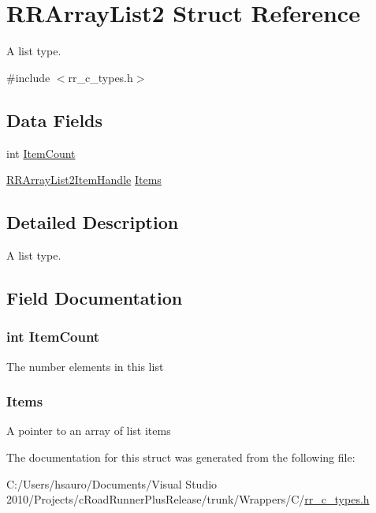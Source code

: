 \hypertarget{struct_r_r_array_list2}{
\section{\-R\-R\-Array\-List2 \-Struct \-Reference}
\label{struct_r_r_array_list2}
}


\-A list type.  




{\ttfamily \#include $<$rr\-\_\-c\-\_\-types.\-h$>$}

\subsection*{\-Data \-Fields}
\begin{DoxyCompactItemize}
\item 
int \hyperlink{struct_r_r_array_list2_ab970c710c7f3897df3c63f76dc5a0793}{\-Item\-Count}
\item 
\hyperlink{rr__c__types_8h_a98a79f5d723f2b60fd6db9c3c6dfa20a}{\-R\-R\-Array\-List2\-Item\-Handle} \hyperlink{struct_r_r_array_list2_aff798cb8027dcb29fd09e5396f8428fe}{\-Items}
\end{DoxyCompactItemize}


\subsection{\-Detailed \-Description}
\-A list type. 

\subsection{\-Field \-Documentation}
\hypertarget{struct_r_r_array_list2_ab970c710c7f3897df3c63f76dc5a0793}{
\subsubsection[{\-Item\-Count}]{\setlength{\rightskip}{0pt plus 5cm}int {\bf \-Item\-Count}}}
\label{struct_r_r_array_list2_ab970c710c7f3897df3c63f76dc5a0793}
\-The number elements in this list \hypertarget{struct_r_r_array_list2_aff798cb8027dcb29fd09e5396f8428fe}{
\subsubsection[{\-Items}]{ {\bf \-Items}}}
\label{struct_r_r_array_list2_aff798cb8027dcb29fd09e5396f8428fe}
\-A pointer to an array of list items 

\-The documentation for this struct was generated from the following file\-:\begin{DoxyCompactItemize}
\item 
\-C\-:/\-Users/hsauro/\-Documents/\-Visual Studio 2010/\-Projects/c\-Road\-Runner\-Plus\-Release/trunk/\-Wrappers/\-C/\hyperlink{rr__c__types_8h}{rr\-\_\-c\-\_\-types.\-h}\end{DoxyCompactItemize}
